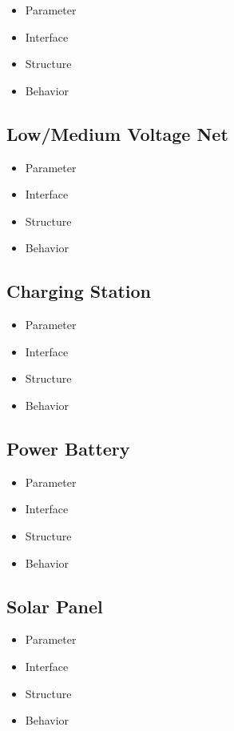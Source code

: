 \begin{itemize}
	\item Parameter
	\item Interface
	\item Structure
	\item Behavior
\end{itemize}

\subsection{Low/Medium Voltage Net}

\begin{itemize}
	\item Parameter
	\item Interface
	\item Structure
	\item Behavior
\end{itemize}

\subsection{Charging Station}

\begin{itemize}
	\item Parameter
	\item Interface
	\item Structure
	\item Behavior
\end{itemize}

\subsection{Power Battery}

\begin{itemize}
	\item Parameter
	\item Interface
	\item Structure
	\item Behavior
\end{itemize}

\subsection{Solar Panel}

\begin{itemize}
	\item Parameter
	\item Interface
	\item Structure
	\item Behavior
\end{itemize}